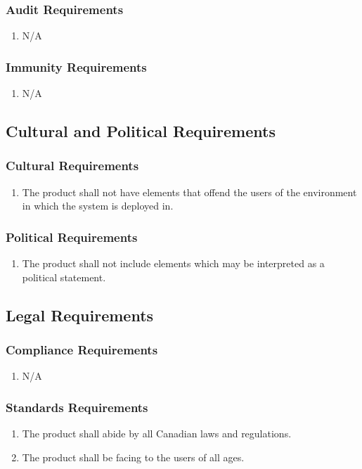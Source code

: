 \documentclass{article}
\begin{document}
\subsubsection{Audit Requirements}
\begin{enumerate}[SR4.1]
    \item N/A
\end{enumerate}
\subsubsection{Immunity Requirements}
\begin{enumerate}[SR5.1]
    \item N/A
\end{enumerate}
\subsection{Cultural and Political Requirements}
\subsubsection{Cultural Requirements}
\begin{enumerate}[CP1.1]
    \item The product shall not have elements that offend the users of the environment in which the system is deployed in.
\end{enumerate}
\subsubsection{Political Requirements}
\begin{enumerate}[CP2.1]
    \item The product shall not include elements which may be interpreted as a political statement.
\end{enumerate}
\subsection{Legal Requirements}
\subsubsection{Compliance Requirements}
\begin{enumerate}[LR1.1]
    \item N/A
\end{enumerate}
\subsubsection{Standards Requirements}
\begin{enumerate}[LR2.1]
    \item The product shall abide by all Canadian laws and regulations.
    \item The product shall be facing to the users of all ages.
\end{enumerate}
\end{document}
